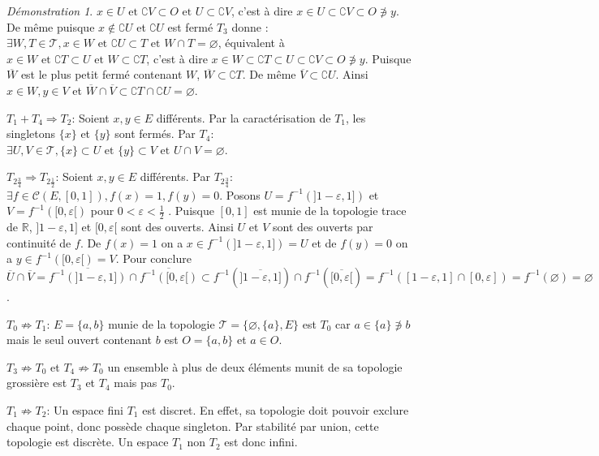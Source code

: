 \documentclass[a4paper, 11pt, french]{book}
\newenvironment{itemise}{\itemize}{\enditemize}
\theoremstyle{plain} %
\theoremstyle{definition} %
\theoremstyle{remark} %
\newtheorem*{demonstration}{Démonstration}
\newcommand{\1}{\mathds{1}}
\newcommand\vide{\varnothing}
\newcommand{\cont}{\mathcal{C}}
\newcommand{\inv}[1]{#1^{-1}}
\newcommand\et{\text{ et }}
\newcommand{\R}{\mathbb{R}}
\begin{document}
\begin{demonstration}
\begin{itemise}
		$x\in U\et\complement V\subset O\et U\subset\complement V$, c'est à dire
		$x\in U\subset\complement V\subset O\not\ni y$.
		De même puisque $x\notin\complement U$ et $\complement U$ est fermé $T_3$ donne :
		$\exists W, T\in\mathscr{T}, x\in W\et\complement U\subset T\et W\cap T=\vide$, équivalent à
		$x\in W\et\complement T\subset U\et W\subset\complement T$, c'est à dire
		$x\in W\subset\complement T\subset U\subset\complement V\subset O\not\ni y$.
		Puisque $\overline{W}$ est le plus petit fermé contenant $W$, $\overline{W}\subset\complement T$.
		De même $\overline{V}\subset\complement U$.
		Ainsi $x\in W, y\in V$ et $\overline{W}\cap\overline{V}\subset\complement T\cap\complement U=\vide$.
		\item[$T_1+T_4\Rightarrow T_2$:] Soient $x, y\in E$ différents.
		Par la caractérisation de $T_1$, les singletons $\{x\}$ et $\{y\}$ sont fermés.
		Par $T_4$: $\exists U, V\in\mathscr{T}, \{x\}\subset U\et\{y\}\subset V\et U\cap V=\vide$.
		\item[$T_{2\frac{3}{4}}\Rightarrow T_{2\frac{1}{2}}$:] Soient $x, y\in E$ différents.
		Par $T_{2\frac{3}{4}}$: $\exists f\in\cont(E, [0, 1]), f(x)=1, f(y)=0$.
		Posons $U=\inv{f}(]1-\varepsilon, 1])$ et $V=\inv{f}([0, \varepsilon[)$ pour $0<\varepsilon<\frac{1}{2}$ .
		Puisque $[0, 1]$ est munie de la topologie trace de $\R$, $]1-\varepsilon, 1]$ et $[0, \varepsilon[$ sont des ouverts.
		Ainsi $U$ et $V$ sont des ouverts par continuité de $f$.
		De $f(x)=1$ on a $x\in\inv{f}(]1-\varepsilon, 1])=U$ et de $f(y)=0$ on a $y\in\inv{f}([0, \varepsilon[)=V$.
		Pour conclure
		$\overline{U}\cap\overline{V}
			=\overline{\inv{f}(]1-\varepsilon, 1])}\cap\overline{\inv{f}([0, \varepsilon[)}
			\subset\inv{f}(\overline{]1-\varepsilon, 1]})\cap\inv{f}(\overline{[0, \varepsilon[})
			=\inv{f}([1-\varepsilon, 1]\cap[0, \varepsilon])
			=\inv{f}(\vide)
			=\vide$.
		\item[$T_0\not\Rightarrow T_1$:] $E=\{a, b\}$ munie de la topologie $\mathscr{T}=\{\vide, \{a\}, E\}$ est $T_0$ car $a\in\{a\}\not\ni b$ mais le seul ouvert contenant $b$ est $O=\{a, b\}$ et $a\in O$.
		\item[$T_3\not\Rightarrow T_0$ et $T_4\not\Rightarrow T_0$] un ensemble à plus de deux éléments munit de sa topologie grossière est $T_3$ et $T_4$ mais pas $T_0$.
		\item[$T_1\not\Rightarrow T_2$:] Un espace fini $T_1$ est discret.
		En effet, sa topologie doit pouvoir exclure chaque point, donc possède chaque singleton.
		Par stabilité par union, cette topologie est discrète.
		Un espace $T_1$ non $T_2$ est donc infini.

\end{itemise}
\end{demonstration}
\end{document}
